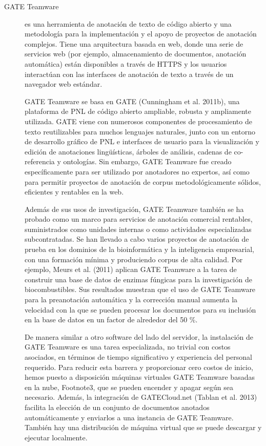 \begin{description}
\item[GATE Teamware] es una herramienta de anotación de texto de código abierto y una metodología para la implementación y el apoyo de proyectos de anotación complejos. Tiene una arquitectura basada en web, donde una serie de servicios web (por ejemplo, almacenamiento de documentos, anotación automática) están disponibles a través de HTTPS y los usuarios interactúan con las interfaces de anotación de texto a través de un navegador web estándar.

GATE Teamware se basa en GATE (Cunningham et al. 2011b), una plataforma de PNL de código abierto ampliable, robusta y ampliamente utilizada. GATE viene con numerosos componentes de procesamiento de texto reutilizables para muchos lenguajes naturales, junto con un entorno de desarrollo gráfico de PNL e interfaces de usuario para la visualización y edición de anotaciones lingüísticas, árboles de análisis, cadenas de co-referencia y ontologías. Sin embargo, GATE Teamware fue creado específicamente para ser utilizado por anotadores no expertos, así como para permitir proyectos de anotación de corpus metodológicamente sólidos, eficientes y rentables en la web.

Además de sus usos de investigación, GATE Teamware también se ha probado como un marco para servicios de anotación comercial rentables, suministrados como unidades internas o como actividades especializadas subcontratadas. Se han llevado a cabo varios proyectos de anotación de prueba en los dominios de la bioinformática y la inteligencia empresarial, con una formación mínima y produciendo corpus de alta calidad. Por ejemplo, Meurs et al. (2011) aplican GATE Teamware a la tarea de construir una base de datos de enzimas fúngicas para la investigación de biocombustibles. Sus resultados muestran que el uso de GATE Teamware para la preanotación automática y la corrección manual aumenta la velocidad con la que se pueden procesar los documentos para su inclusión en la base de datos en un factor de alrededor del 50 \%.

De manera similar a otro software del lado del servidor, la instalación de GATE Teamware es una tarea especializada, no trivial con costos asociados, en términos de tiempo significativo y experiencia del personal requerido. Para reducir esta barrera y proporcionar cero costos de inicio, hemos puesto a disposición máquinas virtuales GATE Teamware basadas en la nube, Footnote3, que se pueden encender y apagar según sea necesario. Además, la integración de GATECloud.net (Tablan et al. 2013) facilita la elección de un conjunto de documentos anotados automáticamente y enviarlos a una instancia de GATE Teamware. También hay una distribución de máquina virtual que se puede descargar y ejecutar localmente.


\end{description}
